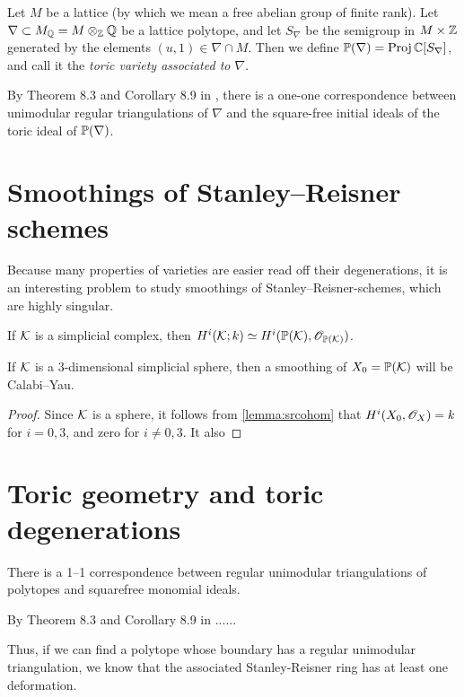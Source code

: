 Let $M$ be a lattice (by which we mean a free abelian group of finite rank). Let $\nabla \subset M_\Q = M \otimes_\Z \Q$ be a lattice polytope, and let $S_\nabla$ be the semigroup in $M \times \Z$ generated by the elements $(u,1) \in \nabla \cap M$. Then we define $\P(\nabla)=\Proj \C[S_\nabla]$, and call it the \emph{toric variety associated to $\nabla$}. 

By Theorem 8.3 and Corollary 8.9 in \cite{sturmfels}, there is a one-one correspondence between unimodular regular triangulations of $\nabla$ and the square-free initial ideals of the toric ideal of $\P(\nabla)$. 


\section{Smoothings of Stanley--Reisner schemes}

Because many properties of varieties are easier read off their degenerations, it is an interesting problem to study smoothings of Stanley--Reisner-schemes, which are highly singular.

\begin{lemma}
\label{lemma:srcohom}
If $\K$ is a simplicial complex, then $H^i(\K;k) \simeq H^i(\P(\K),\OO_{\P(\K)})$.
\end{lemma}

\begin{lemma}
If $\K$ is a 3-dimensional simplicial sphere, then a smoothing of $X_0=\P(\K)$ will be Calabi--Yau.
\end{lemma}
\begin{proof}
Since $\K$ is a sphere, it follows from \ref{lemma:srcohom} that $H^i(X_0,\OO_X)=k$ for $i=0,3$, and zero for $i \neq 0,3$. It also 
\end{proof}


\section{Toric geometry and toric degenerations}
\label{sec:toricgeometry}


\begin{proposition}
\label{eq:unimodular_triangs}
There is a 1--1 correspondence between regular unimodular triangulations of polytopes and squarefree monomial ideals.
\end{proposition}

By Theorem 8.3 and Corollary 8.9 in \cite{sturmfels}......

Thus, if we can find a polytope whose boundary has a regular unimodular triangulation, we know that the associated Stanley-Reisner ring has at least one deformation. 

